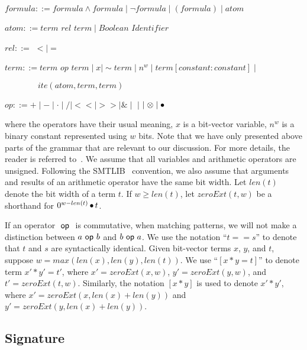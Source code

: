 \vspace{0.2 cm}

$formula ::= formula \land formula \mid \lnot formula \mid (formula) \mid atom$

$atom ::= term$ $rel$ $term \mid Boolean$ $Identifier$

$rel ::= $ $< \mid =$

$term ::= term$ $op$ $term \mid x \mid \sim term \mid n^w \mid term[constant:constant] \mid$

$\qquad \qquad ite(atom, term, term)$

$op ::= + \mid - \mid \cdot \mid / \mid << \mid >> \mid \& \mid $ $\mid$ $\mid \otimes \mid \mathop{\bullet}$

\vspace{0.2 cm}

\noindent where the operators have their usual meaning, $x$ is a bit-vector variable, $n^w$ is a binary constant
represented using $w$ bits.
%
Note that we have only presented above parts of the grammar
that are relevant to our discussion.  For more details,
the reader is referred to~\cite{Kroeningbook,barrett}.
%
We assume that all variables and arithmetic operators are unsigned.
Following the SMTLIB~\cite{SMTLIB} convention, we also assume that
arguments and results of an arithmetic operator have the same bit width.
%
Let $len(t)$ denote the bit width of a term $t$.
%
If $w \geq len(t)$,
let $zeroExt(t,w)$ be a shorthand for  $0^{w-len(t)}\mathop{\bullet} t$.

If an operator $~\mathsf{op}~$ is commutative, when matching patterns, we will
not make a distinction between $a ~\mathsf{op}~ b$ and $b ~\mathsf{op}~ a$.
%
We use the notation ``$t == s$'' to denote that $t$ and $s$ are
syntactically identical.
%
Given bit-vector terms $x$, $y$, and $t$, suppose $w = max(len(x),len(y),
len(t))$.
%
We use ``$[x*y = t]$'' to denote term $x'*y'=t'$, where $x' =
zeroExt(x, w)$, $y' = zeroExt(y, w)$, and $t' = zeroExt(t, w)$.
%
Similarly, the notation $[x*y]$ is used to denote $x' * y'$, where $x'
= zeroExt(x, len(x)+len(y))$ and $y' = zeroExt(y, len(x) + len(y))$.


%

\subsection{Signature}

